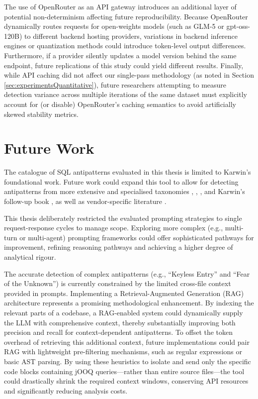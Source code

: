 The use of OpenRouter as an API gateway introduces an additional layer of potential non-determinism affecting future reproducibility. Because OpenRouter dynamically routes requests for open-weights models (such as GLM-5 or gpt-oss-120B) to different backend hosting providers, variations in backend inference engines or quantization methods could introduce token-level output differences. Furthermore, if a provider silently updates a model version behind the same endpoint, future replications of this study could yield different results. Finally, while API caching did not affect our single-pass methodology (as noted in Section \ref{sec:experimentsQuantitative}), future researchers attempting to measure detection variance across multiple iterations of the same dataset must explicitly account for (or disable) OpenRouter's caching semantics to avoid artificially skewed stability metrics.

\section{Future Work}\label{sec:futureWork}

The catalogue of SQL antipatterns evaluated in this thesis is limited to Karwin's foundational work. Future work could expand this tool to allow for detecting antipatterns from more extensive and specialised taxonomies , , ,  and Karwin's follow-up book , as well as vendor-specific literature .

This thesis deliberately restricted the evaluated prompting strategies to single request-response cycles to manage scope. Exploring more complex (e.g., multi-turn or multi-agent) prompting frameworks could offer sophisticated pathways for improvement, refining reasoning pathways and achieving a higher degree of analytical rigour.

The accurate detection of complex antipatterns (e.g., “Keyless Entry” and “Fear of the Unknown”) is currently constrained by the limited cross-file context provided in prompts. Implementing a Retrieval-Augmented Generation (RAG) architecture represents a promising methodological enhancement. By indexing the relevant parts of a codebase, a RAG-enabled system could dynamically supply the LLM with comprehensive context, thereby substantially improving both precision and recall for context-dependent antipatterns. To offset the token overhead of retrieving this additional context, future implementations could pair RAG with lightweight pre-filtering mechanisms, such as regular expressions or basic AST parsing. By using these heuristics to isolate and send only the specific code blocks containing jOOQ queries—rather than entire source files—the tool could drastically shrink the required context windows, conserving API resources and significantly reducing analysis costs.

